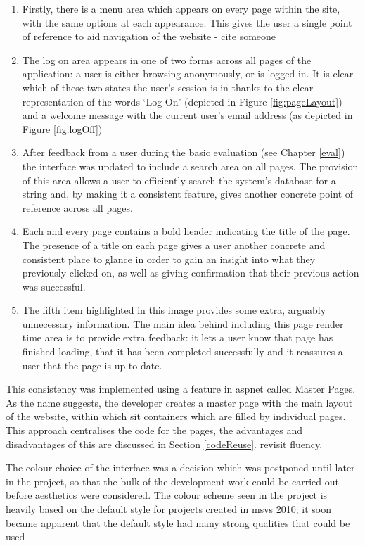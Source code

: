 \begin{enumerate}
	\item Firstly, there is a menu area which appears on every page within the site, with the same options at each appearance.  This gives the user a single point of reference to aid navigation of the website \revisit - cite someone
	\item The log on area appears in one of two forms across all pages of the application: a user is either browsing anonymously, or is logged in.  It is clear which of these two states the user's session is in thanks to the clear representation of the words `Log On' (depicted in Figure \ref{fig:pageLayout}) and a welcome message with the current user's email address (as depicted in Figure \ref{fig:logOff})
	\item After feedback from a user during the basic evaluation (see Chapter \ref{eval}) the interface was updated to include a search area on all pages.  The provision of this area allows a user to efficiently search the system's database for a string and, by making it a consistent feature, gives another concrete point of reference across all pages.
	\item Each and every page contains a bold header indicating the title of the page.  The presence of a title on each page gives a user another concrete and consistent place to glance in order to gain an insight into what they previously clicked on, as well as giving confirmation that their previous action was successful.
	\item The fifth item highlighted in this image provides some extra, arguably unnecessary information.  The main idea behind including this page render time area is to provide extra feedback: it lets a user know that page has finished loading, that it has been completed successfully and it reassures a user that the page is up to date.
\end{enumerate}

This consistency was implemented using a feature in \gls{asp}\gls{net} called Master Pages.  As the name suggests, the developer creates a master page with the main layout of the website, within which sit containers which are filled by individual pages.  This approach centralises the code for the pages, the advantages and disadvantages of this are discussed in Section \ref{codeReuse}. \revisit revisit fluency.

The colour choice of the interface was a decision which was postponed until later in the project, so that the bulk of the development work could be carried out before aesthetics were considered.  The colour scheme seen in the project is heavily based on the default style for projects created in \gls{msvs} 2010; it soon became apparent that the default style had many strong qualities that could be used 

